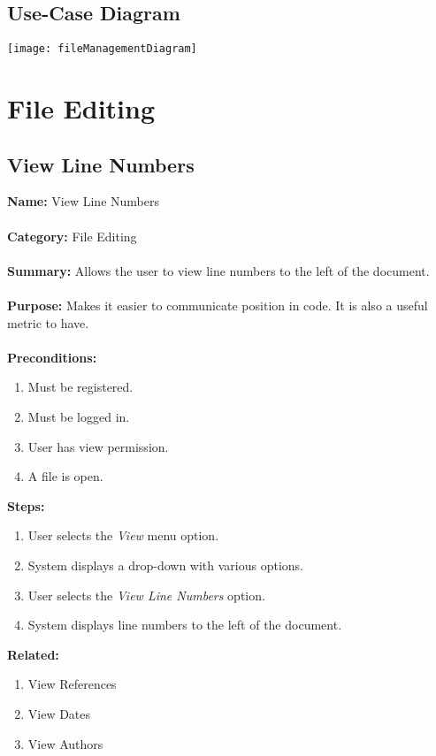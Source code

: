 \documentclass[14pt, a4paper]{article}
\begin{document}
\subsection{Use-Case Diagram}

\hspace*{-1cm}\texttt{[image: fileManagementDiagram]}


\newpage	
		
\section{File Editing}

\subsection{View Line Numbers}

\begin{framed}
	\noindent\textbf{Name:} View Line Numbers \\ \\
	\textbf{Category:} File Editing \\ \\
	\textbf{Summary:} Allows the user to view line numbers to the left of the document. \\ \\
	\textbf{Purpose:} Makes it easier to communicate position in code. It is also a useful metric to have.\\ \\
	\textbf{Preconditions:} 
	\begin{enumerate}
		\item Must be registered.
		\item Must be logged in.
		\item User has view permission.
		\item A file is open.
	\end{enumerate}
	\textbf{Steps:}
	\begin{enumerate}
		\item User selects the \textit{View} menu option.
		\item System displays a drop-down with various options.
		\item User selects the \textit{View Line Numbers} option.
		\item System displays line numbers to the left of the document.
	\end{enumerate}
	\textbf{Related:}
	\begin{enumerate}
		\item View References
		\item View Dates
		\item View Authors
	\end{enumerate}
\end{framed}
\end{document}
